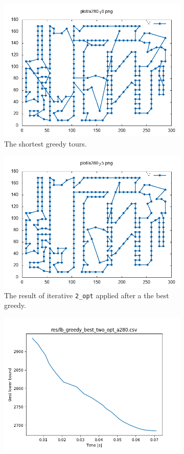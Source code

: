 \begin{figure}[!h]
	\begin{subfigure}{.5\columnwidth}
		\centering
		\includegraphics[width=0.9\columnwidth]{../res/a280_10.png}
		\caption{The shortest greedy tours.}
		\label{fig:a280_10}
	\end{subfigure}
	\begin{subfigure}{.5\columnwidth}
		\centering
		\includegraphics[width=0.9\columnwidth]{../res/a280_25.png}
		\caption{The result of iterative \texttt{2\_opt} applied after a the best greedy.}
		\label{fig:a280_25}
	\end{subfigure}
	\begin{subfigure}{.5\columnwidth}
		\centering
		\includegraphics[width=0.9\columnwidth]{../res/lb_greedy_best_two_opt_a280.png}

\end{subfigure}
\end{figure}
